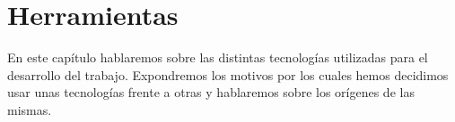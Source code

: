 \chapter{Herramientas}
\label{cap:herramientas}

En este capítulo hablaremos sobre las distintas tecnologías utilizadas para
el desarrollo del trabajo. Expondremos los motivos por los cuales
hemos decidimos usar unas tecnologías frente a otras y hablaremos sobre los
orígenes de las mismas.